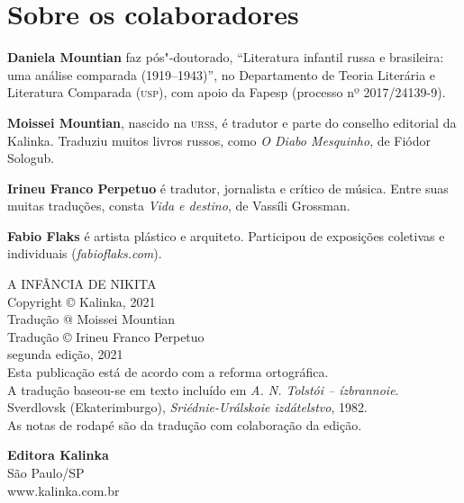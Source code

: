 \section{Sobre os colaboradores}

\noindent\textbf{Daniela Mountian} faz pós"-doutorado,
  ``Literatura infantil russa e brasileira: uma análise comparada
  (1919--1943)'', no Departamento de Teoria Literária e Literatura
  Comparada (\textsc{usp}), com apoio da Fapesp (processo nº 2017/24139-9).

\noindent\textbf{Moissei Mountian}, nascido na \textsc{urss}, é tradutor e parte do
conselho editorial da Kalinka. Traduziu muitos livros russos, como
\emph{O Diabo Mesquinho}, de Fiódor Sologub.

\medskip

\noindent\textbf{Irineu Franco Perpetuo} é tradutor, jornalista e crítico de
música. Entre suas muitas traduções, consta \emph{Vida e destino}, de
Vassíli Grossman.

\medskip

\noindent\textbf{Fabio Flaks} é artista plástico e arquiteto. Participou de
exposições coletivas e individuais (\textit{fabioflaks.com}).

\pagebreak
\thispagestyle{empty}
\movetooddpage
\thispagestyle{empty}
\begingroup\small

\vspace*{\fill}
\begin{flushright}
A INFÂNCIA DE NIKITA\\[6pt]
Copyright © Kalinka, 2021\\[6pt]
Tradução @ Moissei Mountian\\[6pt]
Tradução © Irineu Franco Perpetuo\\[20pt]

segunda edição, 2021\\[20pt]

Esta publicação está de acordo com a reforma ortográfica.\\[6pt]

A tradução baseou-se em texto incluído em \emph{A. N. Tolstói --
ízbrannoie}. Sverdlovsk (Ekaterimburgo), \emph{Sriédnie-Urálskoie
izdátelstvo}, 1982.\\[6pt]

As notas de rodapé são da tradução com colaboração da edição.\\[6pt]
\end{flushright}
\vspace*{\fill}

\vfill


\begin{flushright}
\textbf{Editora Kalinka}\\
São Paulo/SP\\
www.kalinka.com.br
\end{flushright}
\endgroup



